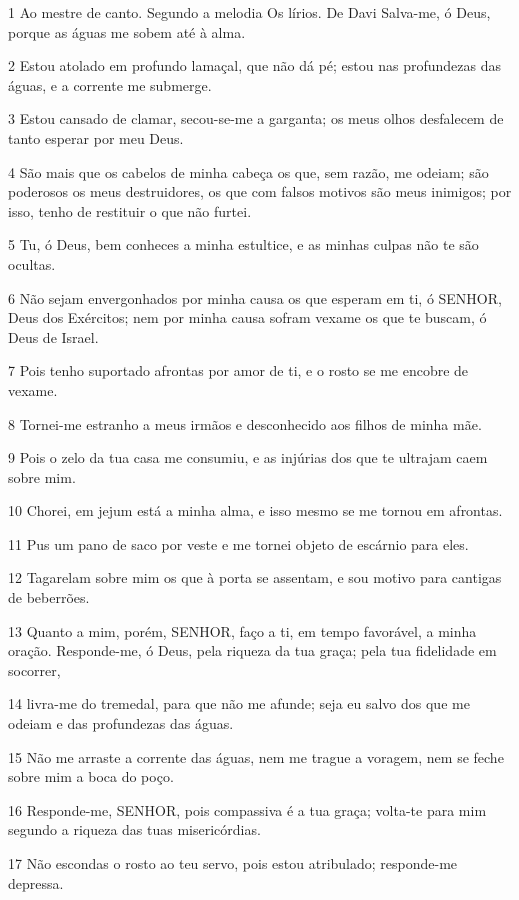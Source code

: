 \par 1 Ao mestre de canto. Segundo a melodia Os lírios. De Davi Salva-me, ó Deus, porque as águas me sobem até à alma.
\par 2 Estou atolado em profundo lamaçal, que não dá pé; estou nas profundezas das águas, e a corrente me submerge.
\par 3 Estou cansado de clamar, secou-se-me a garganta; os meus olhos desfalecem de tanto esperar por meu Deus.
\par 4 São mais que os cabelos de minha cabeça os que, sem razão, me odeiam; são poderosos os meus destruidores, os que com falsos motivos são meus inimigos; por isso, tenho de restituir o que não furtei.
\par 5 Tu, ó Deus, bem conheces a minha estultice, e as minhas culpas não te são ocultas.
\par 6 Não sejam envergonhados por minha causa os que esperam em ti, ó SENHOR, Deus dos Exércitos; nem por minha causa sofram vexame os que te buscam, ó Deus de Israel.
\par 7 Pois tenho suportado afrontas por amor de ti, e o rosto se me encobre de vexame.
\par 8 Tornei-me estranho a meus irmãos e desconhecido aos filhos de minha mãe.
\par 9 Pois o zelo da tua casa me consumiu, e as injúrias dos que te ultrajam caem sobre mim.
\par 10 Chorei, em jejum está a minha alma, e isso mesmo se me tornou em afrontas.
\par 11 Pus um pano de saco por veste e me tornei objeto de escárnio para eles.
\par 12 Tagarelam sobre mim os que à porta se assentam, e sou motivo para cantigas de beberrões.
\par 13 Quanto a mim, porém, SENHOR, faço a ti, em tempo favorável, a minha oração. Responde-me, ó Deus, pela riqueza da tua graça; pela tua fidelidade em socorrer,
\par 14 livra-me do tremedal, para que não me afunde; seja eu salvo dos que me odeiam e das profundezas das águas.
\par 15 Não me arraste a corrente das águas, nem me trague a voragem, nem se feche sobre mim a boca do poço.
\par 16 Responde-me, SENHOR, pois compassiva é a tua graça; volta-te para mim segundo a riqueza das tuas misericórdias.
\par 17 Não escondas o rosto ao teu servo, pois estou atribulado; responde-me depressa.
